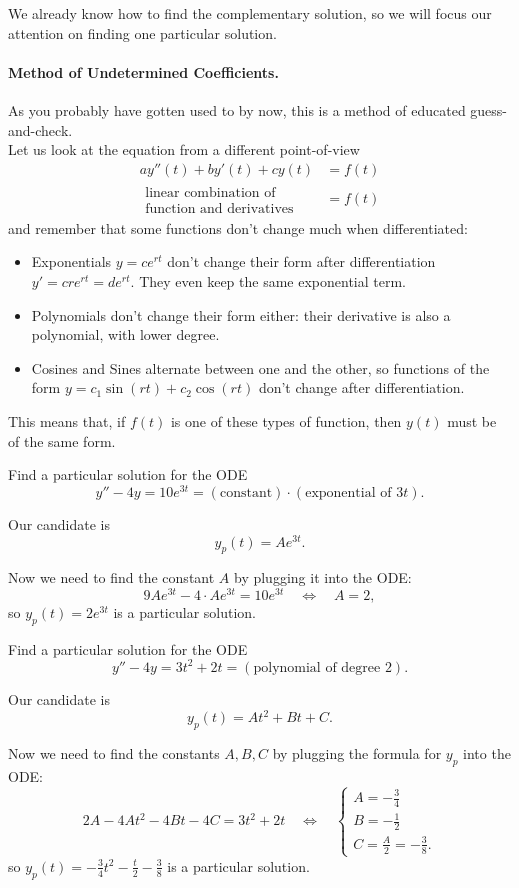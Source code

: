 We already know how to find the complementary solution, so we will focus our attention on finding one particular solution.

\paragraph{\color{cyan}Method of Undetermined Coefficients.} As you probably have gotten used to by now, this is a method of educated guess-and-check. \\

Let us look at the equation from a different point-of-view
\begin{align*}
a y''(t) + by'(t) + cy(t) & = f(t) \\
\substack{\displaystyle\text{linear combination of}\\\displaystyle\text{function and derivatives}} & = f(t)
\end{align*}
and remember that some functions don't change much when differentiated:
\begin{itemize}
	\item Exponentials $y=ce^{rt}$ don't change their form after differentiation $y'=cre^{rt} = de^{rt}$. They even keep the same exponential term.
	\item Polynomials don't change their form either: their derivative is also a polynomial, with lower degree.
	\item Cosines and Sines alternate between one and the other, so functions of the form $y=c_1 \sin(rt) + c_2\cos(rt)$ don't change after differentiation.
\end{itemize}

This means that, if $f(t)$ is one of these types of function, then $y(t)$ must be of the same form.	


\begin{example}
Find a particular solution for the ODE
$$
y''  - 4y = 10 e^{3t} = (\text{constant}) \cdot (\text{exponential of } 3t).
$$	

Our candidate is
$$
y_p(t) = A e^{3t}.
$$

Now we need to find the constant $A$ by plugging it into the ODE:
$$
9 A e^{3t} - 4 \cdot A e^{3t} = 10 e^{3t}
\quad \Leftrightarrow \quad 
	A = 2,
$$
so $y_p(t) = 2 e^{3t}$ is a particular solution.
\end{example}


\begin{example}
Find a particular solution for the ODE
$$
y''  - 4y = 3t^2+2t = (\text{polynomial of degree 2}).
$$	

Our candidate is
$$
y_p(t) = At^2 + Bt + C.
$$

Now we need to find the constants $A, B, C$ by plugging the formula for $y_p$ into the ODE:
$$
2A - 4At^2 - 4B t - 4C = 3t^2+2t
\quad \Leftrightarrow \quad 
\begin{cases}
A = -\frac34 \\
B = -\frac12 \\
C = \frac{A}{2} = -\frac38.	
\end{cases}
$$
so $y_p(t) = -\frac34 t^2 - \frac{t}{2} - \frac38$ is a particular solution.
\end{example}

